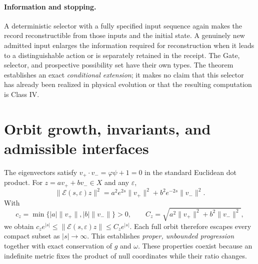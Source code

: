 \documentclass[10pt,letterpaper]{article}
\theoremstyle{definition}\newtheorem{definition}[theorem]{Definition}
\newcommand{\eps}{\varepsilon}
\newcommand{\ph}{\varphi}
\begin{document}
\paragraph{Information and stopping.}
A deterministic selector with a fully specified input sequence again makes the record reconstructible from those inputs and the initial state. A genuinely new admitted input enlarges the information required for reconstruction when it leads to a distinguishable action or is separately retained in the receipt. The Gate, selector, and prospective possibility set have their own types. The theorem establishes an exact \emph{conditional extension}; it makes no claim that this selector has already been realized in physical evolution or that the resulting computation is Class IV.

\section{Orbit growth, invariants, and admissible interfaces}
The eigenvectors satisfy $v_+\cdot v_-=\ph\psi+1=0$ in the standard Euclidean dot product. For $z=av_++bv_-\in X$ and any $\eps$,
\begin{equation}\label{eq:norm}
 \|\mathcal E(s,\eps)z\|^2
 =a^2e^{2s}\|v_+\|^2+b^2e^{-2s}\|v_-\|^2.
\end{equation}
With
\begin{equation}
 c_z=\min\{|a|\|v_+\|,|b|\|v_-\|\}>0,\qquad
 C_z=\sqrt{a^2\|v_+\|^2+b^2\|v_-\|^2},
\end{equation}
we obtain $c_ze^{|s|}\le\|\mathcal E(s,\eps)z\|\le C_ze^{|s|}$. Each full orbit therefore escapes every compact subset as $|s|\to\infty$. This establishes \emph{proper, unbounded progression} together with exact conservation of $g$ and $\omega$. These properties coexist because an indefinite metric fixes the product of null coordinates while their ratio changes.
\end{document}
